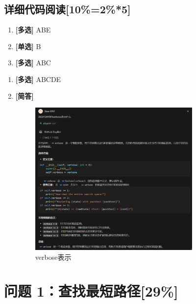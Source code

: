\documentclass{article}
\begin{document}
\subsection{详细代码阅读[10\%=2\%*5]}

\begin{enumerate}[label=(\alph*), start=3]
    \item \textbf{[多选]} ABE %
    \vspace{10pt}

    \item \textbf{[单选]} B %
    \vspace{10pt}

    \item \textbf{[多选]} ABC %
    \vspace{10pt}
\end{enumerate}

\begin{enumerate}[label=(\alph*), start=6]
    \item \textbf{[多选]} ABCDE %
    \vspace{10pt}

    \item  \textbf{[简答]} %
    \begin{figure}[h]
    	\centering
    	\includegraphics[width=0.8\textwidth]{verbose.png}
    	\caption{verbose表示}
    \end{figure}
\end{enumerate}

\section{问题 1：查找最短路径[29\%]}
\end{document}
